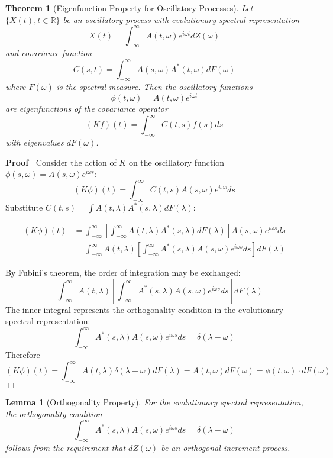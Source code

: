 \documentclass{article}
\newenvironment{proof}{\noindent\textbf{Proof\ }}{\hspace*{\fill}$\Box$\medskip}
\newtheorem{lemma}{Lemma}
\newtheorem{theorem}{Theorem}
\begin{document}
\begin{theorem}[Eigenfunction Property for Oscillatory Processes]
  Let $\{X (t), t \in \mathbb{R}\}$ be an oscillatory process with
  evolutionary spectral representation
  \[ X (t) = \int_{- \infty}^{\infty} A (t, \omega) e^{i \omega t} dZ (\omega)
  \]
  and covariance function
  \[ C (s, t) = \int_{- \infty}^{\infty} A (s, \omega) A^{\ast} (t, \omega) dF
     (\omega) \]
  where $F (\omega)$ is the spectral measure. Then the oscillatory functions
  \[ \phi (t, \omega) = A (t, \omega) e^{i \omega t} \]
  are eigenfunctions of the covariance operator
  \[ (Kf) (t) = \int_{- \infty}^{\infty} C (t, s) f (s) ds \]
  with eigenvalues $dF (\omega)$.
\end{theorem}

\begin{proof}
  Consider the action of $K$ on the oscillatory function $\phi (s, \omega) = A
  (s, \omega) e^{i \omega s}$:
  \[ (K \phi) (t) = \int_{- \infty}^{\infty} C (t, s) A (s, \omega) e^{i
     \omega s} ds \]
  Substitute $C (t, s) = \int A (t, \lambda) A^{\ast} (s, \lambda) dF
  (\lambda)$:
  
  \begin{align*}
    (K \phi) (t) & = \int_{- \infty}^{\infty} \left[ \int_{- \infty}^{\infty}
    A (t, \lambda) A^{\ast} (s, \lambda) dF (\lambda) \right] A (s, \omega)
    e^{i \omega s} ds\\
    & = \int_{- \infty}^{\infty} A (t, \lambda) \left[ \int_{-
    \infty}^{\infty} A^{\ast} (s, \lambda) A (s, \omega) e^{i \omega s} ds
    \right] dF (\lambda)
  \end{align*}
  
  By Fubini's theorem, the order of integration may be exchanged:
  \[ = \int_{- \infty}^{\infty} A (t, \lambda) \left[ \int_{- \infty}^{\infty}
     A^{\ast} (s, \lambda) A (s, \omega) e^{i \omega s} ds \right] dF
     (\lambda) \]
  The inner integral represents the orthogonality condition in the
  evolutionary spectral representation:
  \[ \int_{- \infty}^{\infty} A^{\ast} (s, \lambda) A (s, \omega) e^{i \omega
     s} ds = \delta (\lambda - \omega) \]
  Therefore
  \[ (K \phi) (t) = \int_{- \infty}^{\infty} A (t, \lambda) \delta (\lambda -
     \omega) dF (\lambda) = A (t, \omega) dF (\omega) = \phi (t, \omega) \cdot
     dF (\omega) \]
\end{proof}

\begin{lemma}[Orthogonality Property]
  For the evolutionary spectral representation, the orthogonality condition
  \[ \int_{- \infty}^{\infty} A^{\ast} (s, \lambda) A (s, \omega) e^{i \omega
     s} ds = \delta (\lambda - \omega) \]
  follows from the requirement that $dZ (\omega)$ be an orthogonal increment
  process.
\end{lemma}
\end{document}
